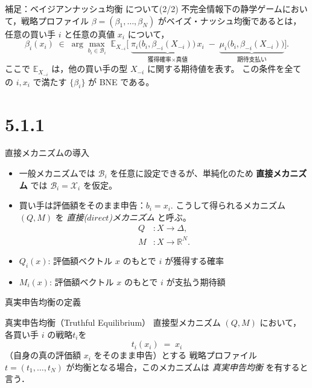\documentclass[dvipdfmx,autodetect-engine]{beamer}
\begin{document}
\begin{frame}[t]{補足：ベイジアンナッシュ均衡 について(2/2)}
  \small
  不完全情報下の静学ゲームにおいて，戦略プロファイル
  \(\beta=(\beta_1,\dots,\beta_N)\) がベイズ・ナッシュ均衡であるとは，
  任意の買い手 \(i\) と任意の真値 \(x_i\) について，
  \[
    \beta_i(x_i)\;\in\;
    \arg\max_{b_i\in\mathcal B_i}
    \;\mathbb{E}_{X_{-i}}\bigl[
      \;\underbrace{\pi_i\bigl(b_i,\beta_{-i}(X_{-i})\bigr)\,x_i}_{\text{獲得確率}\times\text{真値}}
      \;-\;
      \underbrace{\mu_i\bigl(b_i,\beta_{-i}(X_{-i})\bigr)}_{\text{期待支払い}}
    \bigr].
  \]
  ここで \(\mathbb{E}_{X_{-i}}\) は，他の買い手の型 \(X_{-i}\) に関する期待値を表す。
  この条件を全ての \(i,x_i\) で満たす \(\{\beta_i\}\) が BNE である。
\end{frame}

\section{5.1.1}
\begin{frame}{直接メカニズムの導入}
  \begin{itemize}
    \item 一般メカニズムでは $\mathcal{B}_i$ を任意に設定できるが、単純化のため \textbf{直接メカニズム} では $\mathcal{B}_i=\mathcal{X}_i$ を仮定。
    \item 買い手は評価額をそのまま申告：$b_i=x_i$. こうして得られるメカニズム $(Q,M)$ を
      \emph{直接($direct$)メカニズム} と呼ぶ。
    \begin{align}
  Q &\colon X \to \Delta,\\
  M &\colon X \to \mathbb{R}^N.
    \end{align}
    \item $Q_i(x)$: 評価額ベクトル $x$ のもとで $i$ が獲得する確率
    \item $M_i(x)$: 評価額ベクトル $x$ のもとで $i$ が支払う期待額
  \end{itemize}
\end{frame}

\begin{frame}{真実申告均衡の定義}
  \small
  \begin{block}{真実申告均衡（Truthful Equilibrium）}
    直接型メカニズム $(Q,M)$ において，
    各買い手 $i$ の戦略$t_i$を
    \[
      t_i(x_i) \;=\; x_i
    \]
    （自身の真の評価額 $x_i$ をそのまま申告）とする
    戦略プロファイル
    $t=(t_1,\dots,t_N)$ が均衡となる場合，このメカニズムは \emph{真実申告均衡} を有すると言う．
  \end{block}
\end{frame}
\end{document}

